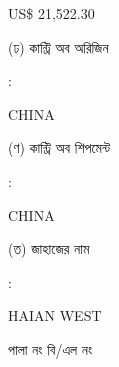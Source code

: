 \documentclass[12pt]{article}
\newcommand{\co}{CHINA}
\newcommand{\coship}{CHINA}
\newcommand{\vessel}{HAIAN WEST}
\newcommand{\price}{US\$ 21,522.30}
\begin{document}
\begin{minipage}[t]{0.53\linewidth}
{\price}
\\
\end{minipage}
\begin{minipage}[t]{0.05\linewidth}
\hspace*{1em}
\end{minipage}
\begin{minipage}[t]{0.40\linewidth}
(ঢ) কান্ট্রি অব অরিজিন
\end{minipage}
\begin{minipage}[t]{0.02\linewidth}
:
\end{minipage}
\begin{minipage}[t]{0.53\linewidth}
{\co}
\\
\end{minipage}
\begin{minipage}[t]{0.05\linewidth}
\hspace*{1em}
\end{minipage}
\begin{minipage}[t]{0.40\linewidth}
(ণ) কান্ট্রি অব শিপমেন্ট
\end{minipage}
\begin{minipage}[t]{0.02\linewidth}
:
\end{minipage}
\begin{minipage}[t]{0.53\linewidth}
{\coship}
\\
\end{minipage}
\begin{minipage}[t]{0.05\linewidth}
\hspace*{1em}
\end{minipage}
\begin{minipage}[t]{0.40\linewidth}
(ত) জাহাজের নাম
\end{minipage}
\begin{minipage}[t]{0.02\linewidth}
:
\end{minipage}
\begin{minipage}[t]{0.53\linewidth}
{\vessel}
\end{minipage}
\begin{minipage}[t]{0.05\linewidth}
\hspace*{1em}
\end{minipage}
\begin{minipage}[t]{0.40\linewidth}
\hspace*{1.8em}পালা নং বি/এল নং
\end{minipage}
\begin{minipage}[t]{0.02\linewidth}
\hspace{1em}
\end{minipage}
\end{document}
